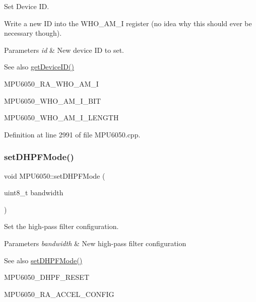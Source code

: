 Set Device ID. 

Write a new ID into the W\+H\+O\+\_\+\+A\+M\+\_\+I register (no idea why this should ever be necessary though). 
\begin{DoxyParams}{Parameters}
{\em id} & New device ID to set. \\
\hline
\end{DoxyParams}
\begin{DoxySeeAlso}{See also}
\mbox{\hyperlink{classMPU6050_a35ae3c8894b3258e642043886801e031}{get\+Device\+I\+D()}} 

M\+P\+U6050\+\_\+\+R\+A\+\_\+\+W\+H\+O\+\_\+\+A\+M\+\_\+I 

M\+P\+U6050\+\_\+\+W\+H\+O\+\_\+\+A\+M\+\_\+\+I\+\_\+\+B\+IT 

M\+P\+U6050\+\_\+\+W\+H\+O\+\_\+\+A\+M\+\_\+\+I\+\_\+\+L\+E\+N\+G\+TH 
\end{DoxySeeAlso}


Definition at line 2991 of file M\+P\+U6050.\+cpp.

\mbox{\label{classMPU6050_a44cc43aaad1e52c1ba3142d4490af611}} 
\subsubsection{\texorpdfstring{setDHPFMode()}{setDHPFMode()}}
{\footnotesize\ttfamily void M\+P\+U6050\+::set\+D\+H\+P\+F\+Mode (\begin{DoxyParamCaption}\item[{uint8\+\_\+t}]{bandwidth }\end{DoxyParamCaption})}



Set the high-\/pass filter configuration. 


\begin{DoxyParams}{Parameters}
{\em bandwidth} & New high-\/pass filter configuration \\
\hline
\end{DoxyParams}
\begin{DoxySeeAlso}{See also}
\mbox{\hyperlink{classMPU6050_a44cc43aaad1e52c1ba3142d4490af611}{set\+D\+H\+P\+F\+Mode()}} 

M\+P\+U6050\+\_\+\+D\+H\+P\+F\+\_\+\+R\+E\+S\+ET 

M\+P\+U6050\+\_\+\+R\+A\+\_\+\+A\+C\+C\+E\+L\+\_\+\+C\+O\+N\+F\+IG 
\end{DoxySeeAlso}



